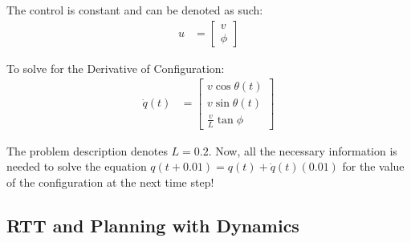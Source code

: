 \documentclass{article}
\begin{document}
The control is constant and can be denoted as such: 
\begin{align}
    u &= \begin{bmatrix}
           v \\
           \phi
         \end{bmatrix}
\end{align}

To solve for the Derivative of Configuration: \newline 
\begin{align}
    \dot{q}(t) &= \begin{bmatrix}
           v\cos{\theta(t)} \\
           v\sin{\theta(t)} \\
           \frac{v}{L} \tan{\phi}
         \end{bmatrix}
\end{align}

The problem description denotes $L = 0.2$. Now, all the necessary information is needed to solve the equation $q(t + 0.01) = q(t) + \dot{q}(t) (0.01)$ for the value of the configuration at the next time step! 
\subsection{RTT and Planning with Dynamics}
\end{document}
